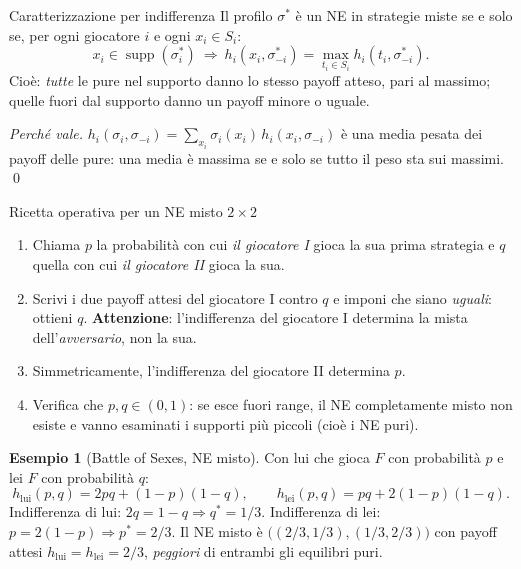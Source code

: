 \documentclass[12pt,a4paper,twoside]{book}
\theoremstyle{plain}
\theoremstyle{definition}
\newtheorem{example}[theorem]{Esempio}
\DeclareMathOperator{\supp}{supp}
\begin{document}
\begin{thmbox}{Caratterizzazione per indifferenza}
Il profilo $\sigma^*$ è un NE in strategie miste se e solo se, per ogni giocatore
$i$ e ogni $x_i\in S_i$:
\[
  x_i\in\supp(\sigma^*_i)\ \Longrightarrow\
  h_i(x_i,\sigma^*_{-i})=\max_{t_i\in S_i} h_i(t_i,\sigma^*_{-i}).
\]
Cioè: \emph{tutte} le pure nel supporto danno lo stesso payoff atteso, pari al
massimo; quelle fuori dal supporto danno un payoff minore o uguale.
\end{thmbox}

\textit{Perché vale.} $h_i(\sigma_i,\sigma_{-i})=\sum_{x_i}\sigma_i(x_i)\,
h_i(x_i,\sigma_{-i})$ è una media pesata dei payoff delle pure: una media è
massima se e solo se tutto il peso sta sui massimi. \qed

\begin{defbox}{Ricetta operativa per un NE misto $2\times 2$}
\begin{enumerate}[leftmargin=*]
  \item Chiama $p$ la probabilità con cui \emph{il giocatore I} gioca la sua prima
        strategia e $q$ quella con cui \emph{il giocatore II} gioca la sua.
  \item Scrivi i due payoff attesi del giocatore I contro $q$ e imponi che siano
        \emph{uguali}: ottieni $q$. \textbf{Attenzione}: l'indifferenza del
        giocatore I determina la mista dell'\emph{avversario}, non la sua.
  \item Simmetricamente, l'indifferenza del giocatore II determina $p$.
  \item Verifica che $p,q\in(0,1)$: se esce fuori range, il NE completamente misto
        non esiste e vanno esaminati i supporti più piccoli (cioè i NE puri).
\end{enumerate}
\end{defbox}

\begin{example}[Battle of Sexes, NE misto]
Con lui che gioca $F$ con probabilità $p$ e lei $F$ con probabilità $q$:
\[
  h_{\text{lui}}(p,q)=2pq+(1-p)(1-q),\qquad
  h_{\text{lei}}(p,q)=pq+2(1-p)(1-q).
\]
Indifferenza di lui: $2q=1-q\Rightarrow q^*=1/3$.
Indifferenza di lei: $p=2(1-p)\Rightarrow p^*=2/3$.
Il NE misto è $\bigl((2/3,1/3),(1/3,2/3)\bigr)$ con payoff attesi
$h_{\text{lui}}=h_{\text{lei}}=2/3$, \emph{peggiori} di entrambi gli equilibri puri.
\end{example}
\end{document}

